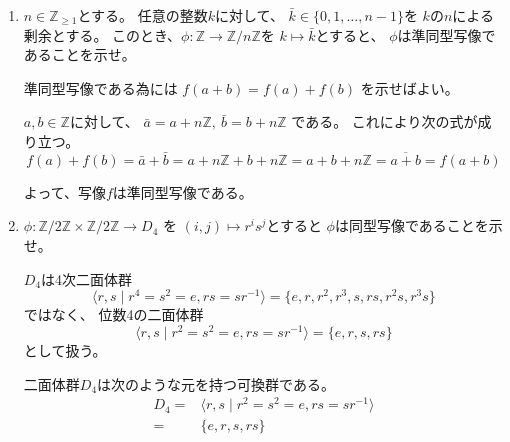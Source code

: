 \documentclass[12pt,b5paper]{ltjsarticle}
\begin{document}
\begin{enumerate}
 \item
      $n\in\mathbb{Z}_{\geq 1}$とする。
      任意の整数$k$に対して、
      $\bar{k}\in\{0,1,\dots,n-1\}$を
      $k$の$n$による剰余とする。
      このとき、$\phi:\mathbb{Z}\to\mathbb{Z}/n\mathbb{Z}$を
      $k\mapsto \bar{k}$とすると、
      $\phi$は準同型写像であることを示せ。

\dotfill


      準同型写像である為には
      $f(a+b)=f(a)+f(b)$
      を示せばよい。

      $a,b\in\mathbb{Z}$に対して、
      $\bar{a}=a+n\mathbb{Z},\ \bar{b}=b+n\mathbb{Z}$
      である。
      これにより次の式が成り立つ。
      \begin{equation}
       f(a)+f(b)
        =\bar{a}+\bar{b}
        =a+n\mathbb{Z}+b+n\mathbb{Z}
        =a+b+n\mathbb{Z}
        =\overline{a+b}
        =f(a+b)
      \end{equation}

      よって、写像$f$は準同型写像である。

\hrulefill
 \item
      $\phi:\mathbb{Z}/2\mathbb{Z}\times\mathbb{Z}/2\mathbb{Z}\to D_{4}$
      を $(i,j)\mapsto r^is^j$とすると
      $\phi$は同型写像であることを示せ。

\dotfill

      $D_{4}$は4次二面体群
      \begin{equation}
       \langle r,s \mid r^4=s^2=e, rs=sr^{-1}\rangle
        =\{e,r,r^2,r^3,s,rs,r^2s,r^3s\}
      \end{equation}
      ではなく、
      位数4の二面体群
      \begin{equation}
       \langle r,s \mid r^2=s^2=e, rs=sr^{-1}\rangle
        = \{e,r,s,rs\}
      \end{equation}
      として扱う。

\dotfill

      二面体群$D_{4}$は次のような元を持つ可換群である。
      \begin{align}
       D_{4} =& \langle r,s \mid r^2=s^2=e, rs=sr^{-1}\rangle\\
       =& \{e,r,s,rs\}
      \end{align}



\end{enumerate}
\end{document}
